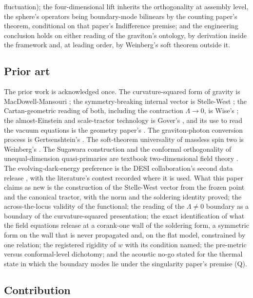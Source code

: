 \documentclass[11pt]{article}
\theoremstyle{definition}
\begin{document}
fluctuation); the four-dimensional lift inherits the orthogonality at assembly level, the sphere's operators being boundary-mode bilinears by the counting paper's theorem, conditional on that paper's Indifference premise; and the engineering conclusion holds on either reading of the graviton's ontology, by derivation inside the framework and, at leading order, by Weinberg's soft theorem outside it.

\subsection*{Prior art}

The prior work is acknowledged once. The curvature-squared form of gravity is MacDowell-Mansouri \cite{MacDowellMansouri1977}; the symmetry-breaking internal vector is Stelle-West \cite{StelleWest1980}; the Cartan-geometric reading of both, including the contraction $\Lambda \to 0$, is Wise's \cite{Wise2010}; the almost-Einstein and scale-tractor technology is Gover's \cite{Gover2010}, and its use to read the vacuum equations is the geometry paper's \cite{ButlerT6}. The graviton-photon conversion process is Gertsenshtein's \cite{Gertsenshtein1962}. The soft-theorem universality of massless spin two is Weinberg's \cite{Weinberg1964}. The Sugawara construction and the conformal orthogonality of unequal-dimension quasi-primaries are textbook two-dimensional field theory \cite{DiFrancesco1997}. The evolving-dark-energy preference is the DESI collaboration's second data release \cite{DESI2025}, with the literature's contest recorded where it is used. What this paper claims as new is the construction of the Stelle-West vector from the frozen point and the canonical tractor, with the norm and the soldering identity proved; the across-the-locus validity of the functional; the reading of the $\Lambda \neq 0$ boundary as a boundary of the curvature-squared presentation; the exact identification of what the field equations release at a corank-one wall of the soldering form, a symmetric form on the wall that is never propagated and, on the flat model, constrained by one relation; the registered rigidity of $w$ with its condition named; the pre-metric versus conformal-level dichotomy; and the acoustic no-go stated for the thermal state in which the boundary modes lie under the singularity paper's premise (Q).

\subsection*{Contribution}
\end{document}
